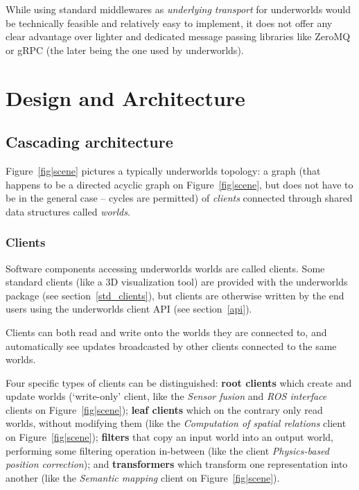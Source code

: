 \documentclass[letterpaper, 10 pt, conference]{ieeeconf}  %
\newcommand{\uwds}{{\sc underworlds}\xspace}
\begin{document}
While using standard middlewares as \emph{underlying transport} for \uwds would be
technically feasible and relatively easy to implement, it does not offer any
clear advantage over lighter and dedicated message passing libraries like ZeroMQ
or gRPC (the later being the one used by \uwds).

\section{Design and Architecture}

\subsection{Cascading architecture}

Figure~\ref{fig|scene} pictures a typically \uwds topology: a graph (that
happens to be a directed acyclic graph on Figure~\ref{fig|scene}, but does not
have to be in the general case -- cycles are permitted) of \emph{clients}
connected through shared data structures called \emph{worlds}.



\subsubsection{Clients}

Software components accessing \uwds worlds are called clients. Some standard
clients (like a 3D visualization tool) are provided with the \uwds package (see
section~\ref{std_clients}), but clients are otherwise written by the end users
using the \uwds client API (see section~\ref{api}).

Clients can both read and write onto the worlds they are connected to, and
automatically see updates broadcasted by other clients connected to the same
worlds.

Four specific types of clients can be distinguished: \textbf{root clients} which
create and update worlds (`write-only' client, like the \emph{Sensor fusion} and
\emph{ROS interface} clients on Figure~\ref{fig|scene}); \textbf{leaf clients}
which on the contrary only read worlds, without modifying them (like the
\emph{Computation of spatial relations} client on Figure~\ref{fig|scene});
\textbf{filters} that copy an input world into an output world, performing
some filtering operation in-between (like the client \textit{Physics-based
position correction}); and \textbf{transformers} which transform one
representation into another (like the \emph{Semantic mapping} client on
Figure~\ref{fig|scene}).
\end{document}
